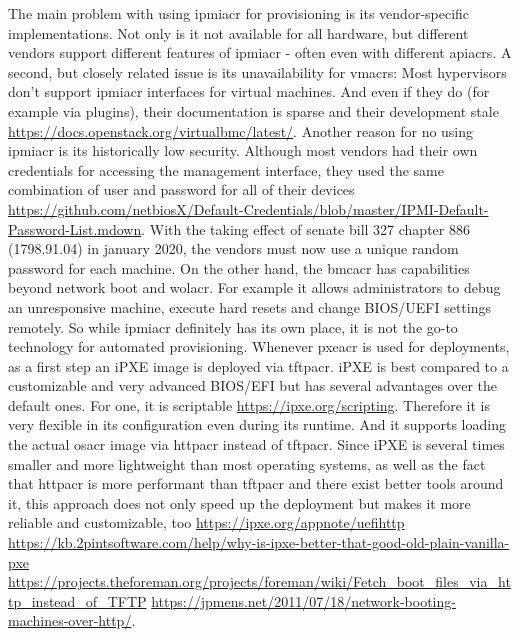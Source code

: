 The main problem with using \gls{ipmiacr} for provisioning is its vendor-specific implementations. Not only is it not available for all hardware, but different vendors support different features of \gls{ipmiacr} - often even with different \gls{apiacr}s. A second, but closely related issue is its unavailability for \gls{vmacr}s: Most hypervisors don't support \gls{ipmiacr} interfaces for virtual machines. And even if they do (for example via plugins), their documentation is sparse and their development stale \url{https://docs.openstack.org/virtualbmc/latest/}.
\newline
Another reason for no using \gls{ipmiacr} is its historically low security. Although most vendors had their own credentials for accessing the management interface, they used the same combination of user and password for all of their devices \url{https://github.com/netbiosX/Default-Credentials/blob/master/IPMI-Default-Password-List.mdown}. With the taking effect of senate bill 327 chapter 886 (1798.91.04) in january 2020, the vendors must now use a unique random password for each machine.
\newline
On the other hand, the \gls{bmcacr} has capabilities beyond network boot and \gls{wolacr}. For example it allows administrators to debug an unresponsive machine, execute hard resets and change BIOS/UEFI settings remotely.
So while \gls{ipmiacr} definitely has its own place, it is not the go-to technology for automated provisioning.
\newline
Whenever \gls{pxeacr} is used for deployments, as a first step an iPXE image is deployed via \gls{tftpacr}. iPXE is best compared to a customizable and very advanced BIOS/EFI but has several advantages over the default ones. For one, it is scriptable \url{https://ipxe.org/scripting}. Therefore it is very flexible in its configuration even during its runtime. And it supports loading the actual \gls{osacr} image via \gls{httpacr} instead of \gls{tftpacr}. Since iPXE is several times smaller and more lightweight than most operating systems, as well as the fact that \gls{httpacr} is more performant than \gls{tftpacr} and there exist better tools around it, this approach does not only speed up the deployment but makes it more reliable and customizable, too \url{https://ipxe.org/appnote/uefihttp} \url{https://kb.2pintsoftware.com/help/why-is-ipxe-better-that-good-old-plain-vanilla-pxe} \url{https://projects.theforeman.org/projects/foreman/wiki/Fetch_boot_files_via_http_instead_of_TFTP} \url{https://jpmens.net/2011/07/18/network-booting-machines-over-http/}.
